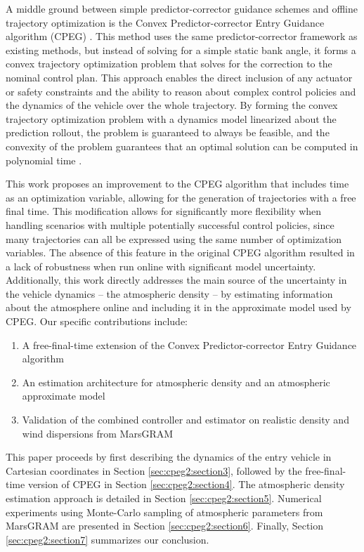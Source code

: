 A middle ground between simple predictor-corrector guidance schemes and offline trajectory optimization is the Convex Predictor-corrector Entry Guidance algorithm (CPEG) \cite{tracy2022a}. This method uses the same predictor-corrector framework as existing methods, but instead of solving for a simple static bank angle, it forms a convex trajectory optimization problem that solves for the correction to the nominal control plan. This approach enables the direct inclusion of any actuator or safety constraints and the ability to reason about complex control policies and the dynamics of the vehicle over the whole trajectory. By forming the convex trajectory optimization problem with a dynamics model linearized about the prediction rollout, the problem is guaranteed to always be feasible, and the convexity of the problem guarantees that an optimal solution can be computed in polynomial time \cite{boyd2004}. 

This work proposes an improvement to the CPEG algorithm that includes time as an optimization variable, allowing for the generation of trajectories with a free final time. This modification allows for significantly more flexibility when handling scenarios with multiple potentially successful control policies, since many trajectories can all be expressed using the same number of optimization variables. The absence of this feature in the original CPEG algorithm resulted in a lack of robustness when run online with significant model uncertainty. Additionally, this work directly addresses the main source of the uncertainty in the vehicle dynamics -- the atmospheric density -- by estimating information about the atmosphere online and including it in the approximate model used by CPEG. Our specific contributions include:
\begin{enumerate}
    \item A free-final-time extension of the Convex Predictor-corrector Entry Guidance algorithm
    \item An estimation architecture for atmospheric density and an atmospheric approximate model
    \item Validation of the combined controller and estimator on realistic density and wind dispersions from MarsGRAM \cite{justh2013}
\end{enumerate}

This paper proceeds by first describing the dynamics of the entry vehicle in Cartesian coordinates in Section \ref{sec:cpeg2:section3}, followed by the free-final-time version of CPEG in Section \ref{sec:cpeg2:section4}. The atmospheric density estimation approach is detailed in Section \ref{sec:cpeg2:section5}. Numerical experiments using Monte-Carlo sampling of atmospheric parameters from MarsGRAM are presented in Section \ref{sec:cpeg2:section6}. Finally, Section \ref{sec:cpeg2:section7} summarizes our conclusion.

